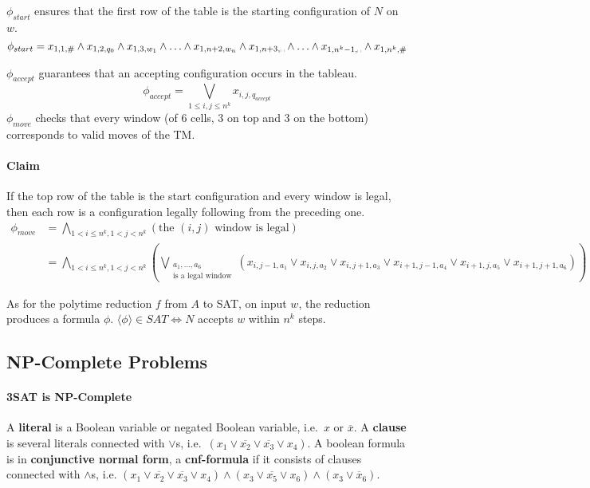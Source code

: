 \documentclass[12 pt]{article}
\begin{document}
$\phi_{start}$ ensures that the first row of the table is the starting
configuration of $N$ on $w$.
$$\phi_{start} = x_{1,1,\#} \land x_{1,2,q_0} \land x_{1,3,w_1} \land
\ldots \land x_{1,n+2,w_n} \land
x_{1,n+3,\text{\textvisiblespace}}\land \ldots \land x_{1,n^k-1,
  \text{\textvisiblespace}} \land x_{1,n^k,\#}$$

$\phi_{accept}$ guarantees that an accepting configuration occurs in
the tableau.
$$\phi_{accept} = \bigvee_{1 \leq i, j \leq n^k}x_{i,j,q_{accept}}$$
$\phi_{move}$ checks that every window (of $6$ cells, $3$ on top and $3$ on
the bottom) corresponds to valid moves of the TM.

\paragraph{Claim} If the top row of the table is the start
configuration and every window is legal, then each row is a
configuration legally following from the preceding one.
\begin{align*}
\phi_{move} & = \bigwedge_{1 < i \leq n^k, 1 < j < n^k} (\text{the }
              (i,j) \text{ window is legal})
  \\ & = \bigwedge_{1 < i \leq n^k, 1 < j < n^k}
       \left(\bigvee_{\substack{a_1, \ldots, a_6\\ \text{is a legal window}}} (x_{i,j-1,a_1} \lor x_{i,j,a_2} \lor x_{i,j+1,a_3}\lor x_{i+1,j-1,a_4}\lor x_{i+1,j,a_5}\lor x_{i+1,j+1,a_6})\right)
\end{align*}

As for the polytime reduction $f$ from $A$ to SAT, on input $w$, the
reduction produces a formula $\phi$. $\langle \phi \rangle \in SAT
\iff N$ accepts $w$ within $n^k$ steps.
\subsection{NP-Complete Problems}
\paragraph{3SAT is NP-Complete} A \textbf{literal} is a Boolean
variable or negated Boolean variable, i.e.\ $x$ or $\overline{x}$. A
\textbf{clause} is several literals connected with $\lor$s, i.e.\
$(x_1 \lor \overline{x_2} \lor \overline{x_3} \lor x_4)$. A boolean
formula is in \textbf{conjunctive normal form}, a \textbf{cnf-formula}
if it consists of clauses connected with $\land$s, i.e. $(x_1 \lor
\overline{x_2} \lor \overline{x_3} \lor x_4) \land (x_3 \lor
\overline{x_5} \lor x_6) \land (x_3 \lor \overline{x}_6)$.
\end{document}
